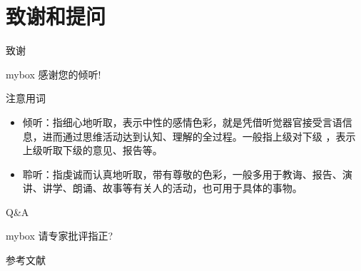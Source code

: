 \documentclass[10pt,aspectratio=43,mathserif,table]{beamer}
\begin{document}
\section{致谢和提问}
\begin{frame}{致谢}
\begin{center}
\begin{minipage}{1\textwidth}
 \begin{beamercolorbox}[wd=0.70\textwidth, rounded=true, shadow=true]{mybox}
\LARGE \centering 感谢您的倾听!  %
\end{beamercolorbox}
 \end{minipage}
\end{center}
\begin{alertblock}{注意用词}
	\begin{itemize}
		\item<0-> 倾听：指细心地听取，表示中性的感情色彩，就是凭借听觉器官接受言语信息，进而通过思维活动达到认知、理解的全过程。一般指上级对下级 ，表示上级听取下级的意见、报告等。
		\item<0-> 聆听：指虔诚而认真地听取，带有尊敬的色彩，一般多用于教诲、报告、演讲、讲学、朗诵、故事等有关人的活动，也可用于具体的事物。
	\end{itemize}
\end{alertblock}
\end{frame}

\begin{frame}{Q\&A}
\begin{center}
	\begin{minipage}{1\textwidth}
		\begin{beamercolorbox}[wd=0.70\textwidth, rounded=true, shadow=true]{mybox}
			\LARGE \centering  请专家批评指正?  %
		\end{beamercolorbox}
	\end{minipage}
\end{center}
\end{frame}
\begin{frame}{参考文献}
	\printbibliography
\end{frame}
\end{document}
